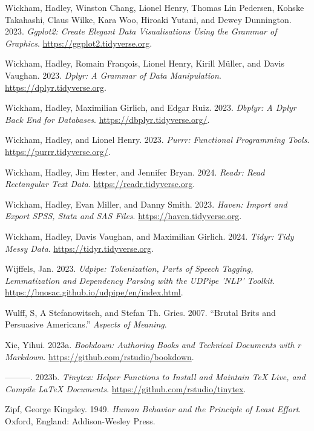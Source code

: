 \documentclass[
  letterpaper,
  DIV=11,
  numbers=noendperiod]{scrreprt}
\newlength{\cslhangindent}
\newenvironment{CSLReferences}[2] %
 {\begin{list}{}{%
  \setlength{\itemindent}{0pt}
  \setlength{\leftmargin}{0pt}
  \setlength{\parsep}{0pt}
  \ifodd #1
   \setlength{\leftmargin}{\cslhangindent}
   \setlength{\itemindent}{-1\cslhangindent}
  \fi
  \setlength{\itemsep}{#2\baselineskip}}}
 {\end{list}}
\theoremstyle{definition}
\theoremstyle{remark}
\begin{document}
\begin{CSLReferences}{1}{0}
Wickham, Hadley, Winston Chang, Lionel Henry, Thomas Lin Pedersen,
Kohske Takahashi, Claus Wilke, Kara Woo, Hiroaki Yutani, and Dewey
Dunnington. 2023. \emph{Ggplot2: Create Elegant Data Visualisations
Using the Grammar of Graphics}. \url{https://ggplot2.tidyverse.org}.

Wickham, Hadley, Romain François, Lionel Henry, Kirill Müller, and Davis
Vaughan. 2023. \emph{Dplyr: A Grammar of Data Manipulation}.
\url{https://dplyr.tidyverse.org}.

Wickham, Hadley, Maximilian Girlich, and Edgar Ruiz. 2023. \emph{Dbplyr:
A Dplyr Back End for Databases}. \url{https://dbplyr.tidyverse.org/}.

Wickham, Hadley, and Lionel Henry. 2023. \emph{Purrr: Functional
Programming Tools}. \url{https://purrr.tidyverse.org/}.

Wickham, Hadley, Jim Hester, and Jennifer Bryan. 2024. \emph{Readr: Read
Rectangular Text Data}. \url{https://readr.tidyverse.org}.

Wickham, Hadley, Evan Miller, and Danny Smith. 2023. \emph{Haven: Import
and Export SPSS, Stata and SAS Files}.
\url{https://haven.tidyverse.org}.

Wickham, Hadley, Davis Vaughan, and Maximilian Girlich. 2024.
\emph{Tidyr: Tidy Messy Data}. \url{https://tidyr.tidyverse.org}.

Wijffels, Jan. 2023. \emph{Udpipe: Tokenization, Parts of Speech
Tagging, Lemmatization and Dependency Parsing with the UDPipe 'NLP'
Toolkit}. \url{https://bnosac.github.io/udpipe/en/index.html}.

Wulff, S, A Stefanowitsch, and Stefan Th. Gries. 2007. {``Brutal Brits
and Persuasive Americans.''} \emph{Aspects of Meaning}.

Xie, Yihui. 2023a. \emph{Bookdown: Authoring Books and Technical
Documents with r Markdown}. \url{https://github.com/rstudio/bookdown}.

---------. 2023b. \emph{Tinytex: Helper Functions to Install and
Maintain TeX Live, and Compile LaTeX Documents}.
\url{https://github.com/rstudio/tinytex}.

Zipf, George Kingsley. 1949. \emph{Human Behavior and the Principle of
Least Effort}. Oxford, England: Addison-Wesley Press.

\end{CSLReferences}
\end{document}
